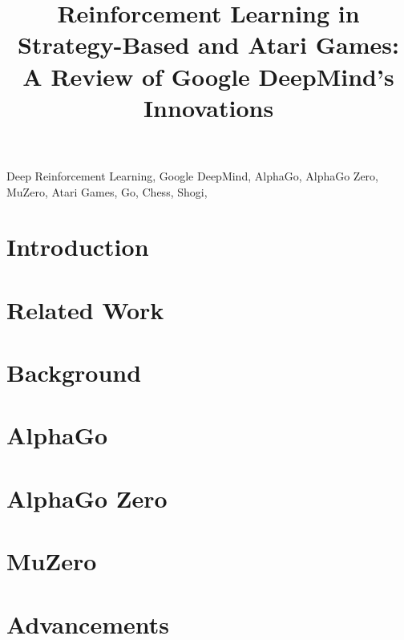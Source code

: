 \documentclass[conference]{IEEEtran}
\begin{document}
\title{Reinforcement Learning in Strategy-Based and Atari Games: A Review of Google DeepMind's Innovations\\}



\maketitle
\thispagestyle{plain}
\pagestyle{plain}
\begin{abstract}

    

\end{abstract}

\begin{IEEEkeywords}
    Deep Reinforcement Learning, Google DeepMind, AlphaGo, AlphaGo Zero, MuZero, Atari Games, Go, Chess, Shogi,
\end{IEEEkeywords}

\section{Introduction}

\section{Related Work}


\section{Background}


\section{AlphaGo}


\section{AlphaGo Zero}


\section{MuZero}


\section{Advancements}

\end{document}

